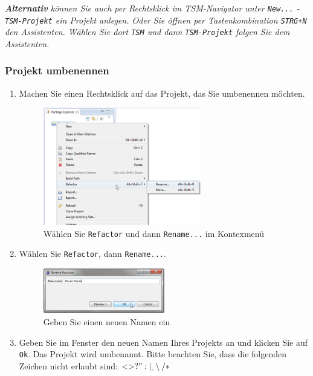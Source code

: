 \documentclass[11pt,a4paper,titlepage]{article}
\begin{document}
\textit{\textbf{Alternativ} können Sie auch per Rechtsklick im TSM-Navigator unter \texttt{New...} - \texttt{TSM-Projekt} ein Projekt anlegen.
Oder Sie öffnen per Tastenkombination \texttt{STRG+N} den Assistenten. Wählen Sie dort \texttt{TSM} und dann \texttt{TSM-Projekt} folgen Sie dem Assistenten.}


\subsubsection{Projekt umbenennen}
\begin{enumerate}
\item Machen Sie einen Rechtsklick auf das Projekt, das Sie umbenennen möchten.


\begin{figure}[H]
\centering
\includegraphics[width= 260px]{BilderHandbuch/UmbenennenR.png}
\caption{Wählen Sie \texttt{Refactor} und dann \texttt{Rename...} im Kontexmenü}
\label{fig:UmbennenR1}
\end{figure}

\item Wählen Sie \texttt{Refactor}, dann \texttt{Rename...}.

\begin{figure}[H]
\centering
\includegraphics[width= 200px]{BilderHandbuch/UmbenennenFenster.png}
\caption{Geben Sie einen neuen Namen ein}
\label{fig:UmbenennenFenster2}
\end{figure}

\item Geben Sie im Fenster den neuen Namen Ihres Projekts an und klicken Sie auf \texttt{Ok}. Das Projekt wird umbenannt.
Bitte beachten Sie, dass die folgenden Zeichen nicht erlaubt sind: $ < > ? " : | _ . \setminus / *$
\end{enumerate}
\end{document}
